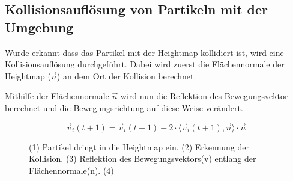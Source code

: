 \begin{Spacing}{\mylinespace}
    \subsection{Kollisionsauflösung von Partikeln mit der Umgebung}
    	Wurde erkannt dass das Partikel mit der Heightmap kollidiert ist, wird eine
    	Kollisionsauflösung durchgeführt. Dabei wird zuerst die Flächennormale
    	der Heightmap ($\vec{n}$) an dem Ort der Kollision berechnet.


    	Mithilfe der Flächennormale $\vec{n}$ wird nun die Reflektion des Bewegungsvektor
    	berechnet und die Bewegungsrichtung auf diese Weise verändert.

    	\[ \vec{v}_{i}(t+1) = \vec{v}_{i}(t+1) -2 \cdot \langle \vec{v}_{i}(t+1) , \vec{n} \rangle \cdot \vec{n} \]

		\begin{figure}[h!]
			\caption{(1) Partikel dringt in die Heightmap ein. (2) Erkennung der Kollision. (3) Reflektion des Bewegungsvektors(v) entlang der Flächennormale(n). (4) }
			\label{fig:reflexHeihtmap}
		\end{figure}


\end{Spacing}
